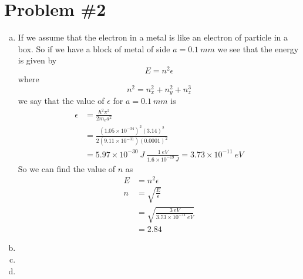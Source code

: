 \documentclass[11pt]{article}
\numberwithin{equation}{section}
\begin{document}
\section{Problem \#2}
\begin{enumerate}[(a)]
\item
If we assume that the electron in a metal is like an electron of particle in a box. So if we have a block of metal of side $a=0.1\ mm$ we see that the energy is given by 
$$E = n^2\epsilon$$
where 
$$n^2 = n_x^2+n_y^2+n_z^3$$
we say that the value of $\epsilon$ for $a=0.1\ mm$ is 
\begin{align*}
\epsilon &= \frac{\hbar^2\pi^2}{2m_ea^2}\\
&= \frac{(1.05\times10^{-34})^2(3.14)^2}{2(9.11\times10^{-31})(0.0001)^2}\\
&= 5.97\times10^{-30}\ J\ \frac{1\ eV}{1.6\times10^{-19}\ J} = 3.73\times10^{-11}\ eV
\end{align*}
So we can find the value of $n$ as
\begin{align*}
E &= n^2\epsilon\\
n &= \sqrt{\frac{E}{\epsilon}}\\
&= \sqrt{\frac{3\ eV}{3.73\times10^{-11}\ eV}}\\
&= 2.84
\end{align*}

\item
\item
\item
\end{enumerate}
\end{document}
